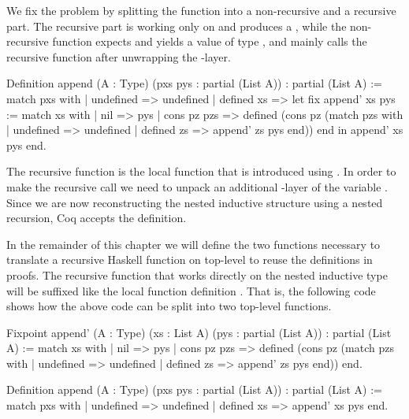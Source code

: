 We fix the problem by splitting the function into a non\--recursive and a recursive part.
The recursive part is working only on  and produces a , while the non\--recursive
function expects and yields a value of type , and mainly calls the recursive function after unwrapping the
\--layer.

\begin{coqcode}
Definition append (A : Type) (pxs pys : partial (List A))
  : partial (List A) :=
  match pxs with
  | undefined  => undefined
  | defined xs =>
    let fix append' xs pys :=
        match xs with
        | nil         => pys
        | cons pz pzs => defined (cons pz (match pzs with
                                          | undefined  => undefined
                                          | defined zs => append' zs pys
                                          end))
        end
    in append' xs pys
  end.
\end{coqcode}

The recursive function is the local function  that is introduced using .
In order to make the recursive call we need to unpack an additional \--layer of the variable .
Since we are now reconstructing the nested inductive structure using a nested recursion, Coq accepts the definition.

In the remainder of this chapter we will define the two functions necessary to translate a recursive Haskell function on top\--level to reuse the definitions in proofs.
The recursive function that works directly on the nested inductive type will be suffixed like the local function definition .
That is, the following code shows how the above code can be split into two top\--level functions.

\begin{coqcode}
Fixpoint append' (A : Type) (xs : List A) (pys : partial (List A))
  : partial (List A) :=
  match xs with
  | nil         => pys
  | cons pz pzs => defined (cons pz (match pzs with
                                    | undefined  => undefined
                                    | defined zs => append' zs pys
                                    end))
  end.

Definition append (A : Type) (pxs pys : partial (List A))
  : partial (List A) :=
  match pxs with
  | undefined  => undefined
  | defined xs => append' xs pys
  end.
\end{coqcode}

